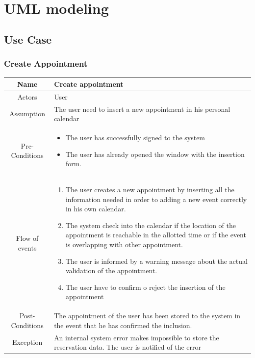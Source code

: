 \chapter{UML modeling}
\label{cha:modeling}

\section{Use Case}
\subsection{Create Appointment}
\begin{center}
	\begin{tabular}{|c||p{}|}
		\hline
		Name & Create appointment \\ \hline
		Actors & User \\ \hline
		Assumption & The user need to insert a new appointment in his personal calendar \\ \hline
		Pre-Conditions & \begin{itemize}
			\item The user has successfully signed to the system
			\item The user has already opened the window with the insertion form.
		\end{itemize} \\ \hline
		Flow of events & \begin{enumerate}
			\item The user creates a new appointment by inserting all the information needed in order to adding a new event correctly in his own calendar.
			\item The system check into the calendar if the location of the appointment is reachable in the allotted time or if the event is overlapping with other appointment.
			\item The user is informed by a warning message about the actual validation of the appointment.
			\item The user have to confirm o reject the insertion of the appointment
		\end{enumerate} \\ \hline
		Post-Conditions & The appointment of the user has been stored to the system in the event that he has confirmed the inclusion. \\ \hline
		Exception & An internal system error makes impossible to store the reservation data. The user is notified of the error \\ \hline		
	\end{tabular}
\end{center}

